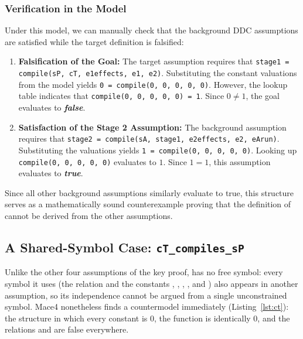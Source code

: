 \subsubsection{Verification in the Model}
Under this model, we can manually check that the background DDC assumptions are satisfied while the target definition is falsified:
\begin{enumerate}
    \item \textbf{Falsification of the Goal:} The target assumption requires that \texttt{stage1 = compile(sP,\allowbreak{} cT,\allowbreak{} e1effects,\allowbreak{} e1,\allowbreak{} e2)}. Substituting the constant valuations from the model yields \texttt{0 = compile(0, 0,\allowbreak{} 0,\allowbreak{} 0, 0)}.
    However, the lookup table indicates that \texttt{compile(0, 0,\allowbreak{} 0,\allowbreak{} 0, 0) = 1}. Since $0 \neq 1$, the goal evaluates to \textbf{\emph{false}}.
    \item \textbf{Satisfaction of the Stage 2 Assumption:} The background assumption requires that \texttt{stage2 =\allowbreak{} compile(sA,\allowbreak{} stage1,\allowbreak{} e2effects, e2,\allowbreak{} eArun)}. Substituting the valuations yields \texttt{1 = compile(0,\allowbreak{} 0,\allowbreak{} 0,\allowbreak{} 0,\allowbreak{} 0)}.
    Looking up \texttt{compile(0,\allowbreak{} 0,\allowbreak{} 0,\allowbreak{} 0,\allowbreak{} 0)} evaluates to $1$. Since $1 = 1$, this assumption evaluates to \textbf{\emph{true}}.
\end{enumerate}

Since all other background assumptions similarly evaluate to true, this structure serves as a mathematically sound counterexample proving that the definition of  cannot be derived from the other assumptions.

\subsection{A Shared-Symbol Case: \texttt{cT\_compiles\_sP}}

Unlike the other four assumptions of the key proof,  has no free symbol: every symbol it uses (the relation  and the constants , , , , and ) also appears in another assumption, so its independence cannot be argued from a single unconstrained symbol. Mace4 nonetheless finds a countermodel immediately (Listing~\ref{lst:ct}): the structure in which every constant is $0$, the function  is identically $0$, and the relations  and  are false everywhere.

